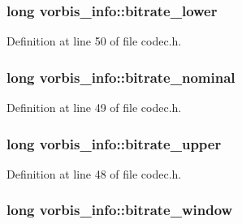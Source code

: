\subsubsection[{\texorpdfstring{bitrate\+\_\+lower}{bitrate_lower}}]{\setlength{\rightskip}{0pt plus 5cm}long vorbis\+\_\+info\+::bitrate\+\_\+lower}\hypertarget{structvorbis__info_a216284288febd46a5547901cd5e6cd62}{}\label{structvorbis__info_a216284288febd46a5547901cd5e6cd62}


Definition at line 50 of file codec.\+h.

\subsubsection[{\texorpdfstring{bitrate\+\_\+nominal}{bitrate_nominal}}]{\setlength{\rightskip}{0pt plus 5cm}long vorbis\+\_\+info\+::bitrate\+\_\+nominal}\hypertarget{structvorbis__info_a71127d3e35c30fa110d7f321302a91b8}{}\label{structvorbis__info_a71127d3e35c30fa110d7f321302a91b8}


Definition at line 49 of file codec.\+h.

\subsubsection[{\texorpdfstring{bitrate\+\_\+upper}{bitrate_upper}}]{\setlength{\rightskip}{0pt plus 5cm}long vorbis\+\_\+info\+::bitrate\+\_\+upper}\hypertarget{structvorbis__info_a2d9d0e0725ae71c855ad39ce07bf7c88}{}\label{structvorbis__info_a2d9d0e0725ae71c855ad39ce07bf7c88}


Definition at line 48 of file codec.\+h.

\subsubsection[{\texorpdfstring{bitrate\+\_\+window}{bitrate_window}}]{\setlength{\rightskip}{0pt plus 5cm}long vorbis\+\_\+info\+::bitrate\+\_\+window}\hypertarget{structvorbis__info_aa511ecfc9eee8129df8f70e62ed08dc7}{}\label{structvorbis__info_aa511ecfc9eee8129df8f70e62ed08dc7}


